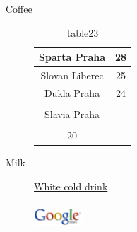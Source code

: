 \documentclass{article}
\begin{document}
\begin{description}
\item[Coffee] \hspace{1pt} 

 \begin{table}[!ht]
\caption{
table23}
\centering

 \begin{tabular}
{ |c|c| }
\hline   Sparta Praha & 28\\ 
\hline Slovan Liberec & 25\\ 
\hline Dukla Praha & 24\\ 
\hline  \\ 
 Slavia Praha  \\ 
  &  \\ 
 20\\ 
\hline 
 \end{tabular}
\end{table}
\item[Milk] \hspace{1pt} 
\href{google.com}{White cold drink } \\ 
\includegraphics[height=50pt,width=50pt]{logo.png} \\
\end{description}
\end{document}
